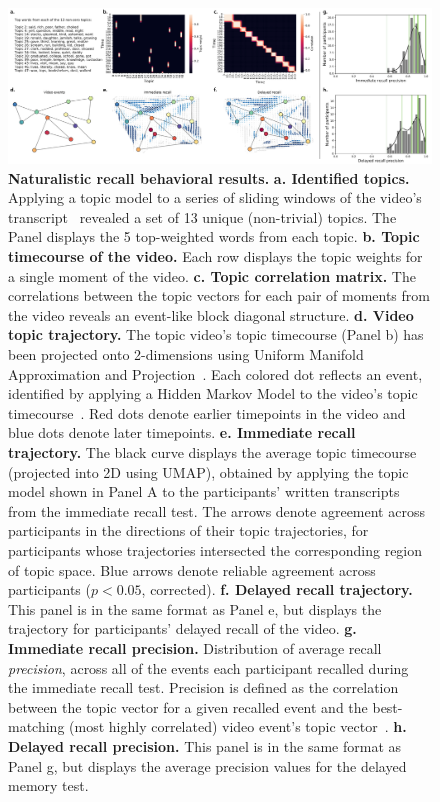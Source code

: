 \documentclass[10pt]{article}
\begin{document}
\begin{figure}
\centering
\includegraphics[width=1\textwidth]{figs/naturalistic_recall_behavior}
\caption{\textbf{Naturalistic recall behavioral results.}
  \textbf{a. Identified topics.}  Applying a topic model to a series
  of sliding windows of the video's transcript~\citep{HeusEtal21}
  revealed a set of 13 unique (non-trivial) topics.  The Panel
  displays the 5 top-weighted words from each topic.  \textbf{b. Topic
  timecourse of the video.}  Each row displays the topic weights for a
single moment of the video.  \textbf{c. Topic correlation matrix.}  The
correlations between the topic vectors for each pair of moments from
the video reveals an event-like block diagonal structure.
\textbf{d. Video topic trajectory.}  The topic video's topic
timecourse (Panel b) has been projected onto 2-dimensions using
Uniform Manifold Approximation and
Projection~\citep[UMAP;][]{McInEtal18}.  Each colored dot reflects an
event, identified by applying a Hidden Markov Model to the video's
topic timecourse~\citep{BaldEtal17, HeusEtal21}.  Red dots denote
earlier timepoints in the video and blue dots denote later
timepoints.  \textbf{e. Immediate recall trajectory.}  The black curve
displays the average
topic timecourse (projected into 2D using UMAP), obtained by applying the topic model shown in Panel A
to the participants' written transcripts from the immediate recall
test.  The arrows denote agreement across participants in the
directions of their topic trajectories, for participants whose
trajectories intersected the corresponding region of topic space.
Blue arrows denote reliable agreement across participants ($p < 0.05$, corrected).
\textbf{f. Delayed recall trajectory.} This panel is in the same
format as Panel e, but displays the trajectory for participants'
delayed recall of the video.  \textbf{g. Immediate recall precision.}  Distribution of
average recall \textit{precision}, across all of the events each
participant recalled during the immediate recall test.  Precision is
defined as the correlation between the topic vector for a given
recalled event and the best-matching (most highly correlated) video
event's topic
vector~\citep{HeusEtal21}.  \textbf{h. Delayed recall precision.}
This panel is in the same format as Panel g, but displays the average
precision values for the delayed memory test.}
\label{fig:nat_behavioral}
\end{figure}
\end{document}
